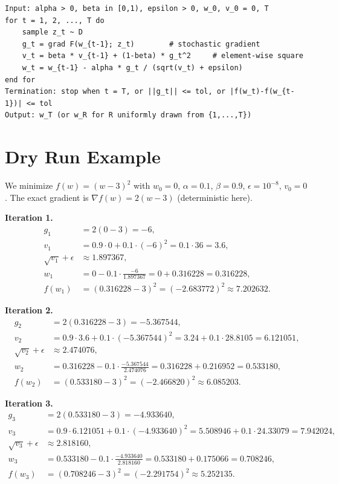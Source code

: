 \documentclass[11pt]{article}
\begin{document}
\begin{verbatim}
Input: alpha > 0, beta in [0,1), epsilon > 0, w_0, v_0 = 0, T
for t = 1, 2, ..., T do
    sample z_t ~ D
    g_t = grad F(w_{t-1}; z_t)        # stochastic gradient
    v_t = beta * v_{t-1} + (1-beta) * g_t^2     # element-wise square
    w_t = w_{t-1} - alpha * g_t / (sqrt(v_t) + epsilon)
end for
Termination: stop when t = T, or ||g_t|| <= tol, or |f(w_t)-f(w_{t-1})| <= tol
Output: w_T (or w_R for R uniformly drawn from {1,...,T})
\end{verbatim}

\section*{Dry Run Example}

We minimize $f(w)=(w-3)^2$ with $w_0=0$, $\alpha=0.1$,
$\beta=0.9$, $\epsilon=10^{-8}$, $v_0=0$.
The exact gradient is $\nabla f(w)=2(w-3)$ (deterministic here).

\textbf{Iteration 1.}
\begin{align*}
g_1 &= 2(0-3) = -6,\\
v_1 &= 0.9\cdot 0 + 0.1\cdot(-6)^2 = 0.1\cdot 36 = 3.6,\\
\sqrt{v_1}+\epsilon &\approx 1.897367,\\
w_1 &= 0 - 0.1\cdot\frac{-6}{1.897367}
       = 0 + 0.316228 = 0.316228,\\
f(w_1) &= (0.316228-3)^2 = (-2.683772)^2 \approx 7.202632.
\end{align*}

\textbf{Iteration 2.}
\begin{align*}
g_2 &= 2(0.316228-3) = -5.367544,\\
v_2 &= 0.9\cdot 3.6 + 0.1\cdot(-5.367544)^2
      = 3.24 + 0.1\cdot 28.8105 = 6.121051,\\
\sqrt{v_2}+\epsilon &\approx 2.474076,\\
w_2 &= 0.316228 - 0.1\cdot\frac{-5.367544}{2.474076}
      = 0.316228 + 0.216952 = 0.533180,\\
f(w_2) &= (0.533180-3)^2 = (-2.466820)^2 \approx 6.085203.
\end{align*}

\textbf{Iteration 3.}
\begin{align*}
g_3 &= 2(0.533180-3) = -4.933640,\\
v_3 &= 0.9\cdot 6.121051 + 0.1\cdot(-4.933640)^2
      = 5.508946 + 0.1\cdot 24.33079 = 7.942024,\\
\sqrt{v_3}+\epsilon &\approx 2.818160,\\
w_3 &= 0.533180 - 0.1\cdot\frac{-4.933640}{2.818160}
      = 0.533180 + 0.175066 = 0.708246,\\
f(w_3) &= (0.708246-3)^2 = (-2.291754)^2 \approx 5.252135.
\end{align*}
\end{document}
